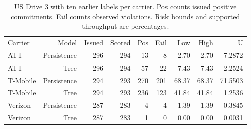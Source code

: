 \begin{table}[!ht]
\centering\small
\caption{US Drive 3 with ten earlier labels per carrier. Pos counts issued positive commitments. Fail counts observed violations. Risk bounds and supported throughput are percentages.}
\begin{tabular}{lrrrrrrrr}
\hline
Carrier & Model & Issued & Scored & Pos & Fail & Low & High & U \\
ATT & Persistence & 296 & 294 & 13 & 8 & 2.70 & 2.70 & 7.2872 \\
ATT & Tree & 296 & 294 & 57 & 22 & 7.43 & 7.43 & 2.2524 \\
T-Mobile & Persistence & 294 & 293 & 270 & 201 & 68.37 & 68.37 & 71.5503 \\
T-Mobile & Tree & 294 & 293 & 236 & 123 & 41.84 & 41.84 & 1.2536 \\
Verizon & Persistence & 287 & 283 & 4 & 4 & 1.39 & 1.39 & 0.3845 \\
Verizon & Tree & 287 & 283 & 1 & 0 & 0.00 & 0.00 & 0.0031 \\
\hline
\end{tabular}
\end{table}
